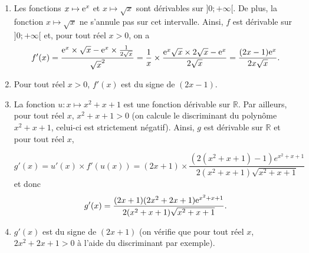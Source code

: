 \documentclass[11pt,fleqn, openany]{book} %
\begin{document}
\begin{solution}\vspace{0pt}
\begin{enumerate}\item  Les fonctions \(x \mapsto \mathrm{e}^x\) et \(x\mapsto \sqrt{x}\) sont dérivables sur \(]0;+\infty[\). De plus, la fonction \(x \mapsto \sqrt{x}\) ne s'annule pas sur cet intervalle. Ainsi, \(f\) est dérivable sur \(]0;+\infty[\) et, pour tout réel \(x>0\), on a 
\[f'(x)= \dfrac{\mathrm{e}^x \times \sqrt{x} - \mathrm{e}^x \times \frac{1}{2\sqrt{x}}}{\sqrt{x}^2} = \dfrac{1}{x} \times \dfrac{\mathrm{e}^x\sqrt{x} \times 2 \sqrt{x} - \mathrm{e}^x}{2\sqrt{x}} = \dfrac{(2x-1)\mathrm{e}^x}{2x\sqrt{x}}.\]

\item Pour tout réel \(x>0\), \(f'(x)\) est du signe de \((2x-1)\).

\begin{center}
\end{center}


\item La fonction \(u : x\mapsto x^2+x+1\) est une fonction dérivable sur \(\mathbb{R}\). Par ailleurs, pour tout réel \(x\), \(x^2+x+1>0\) (on calcule le discriminant du polynôme \(x^2+x+1\), celui-ci est strictement négatif). Ainsi, \(g\) est dérivable sur \(\mathbb{R}\) et pour tout réel \(x\),

\[g'(x)= u'(x) \times f'(u(x)) = (2x+1) \times \dfrac{(2(x^2+x+1)-1)e^{x^2+x+1}}{2(x^2+x+1)\sqrt{x^2+x+1}}\]
et donc
\[g'(x)= \dfrac{(2x+1)(2x^2+2x+1)\mathrm{e}^{x^2+x+1}}{2(x^2+x+1)\sqrt{x^2+x+1}} .\]
\item \(g'(x)\) est du signe de \((2x+1)\) (on vérifie que pour tout réel \(x\), \(2x^2+2x+1 > 0\) à l'aide du discriminant par exemple).

\begin{center}
\end{center}
\end{enumerate}
\end{solution}
\end{document}
